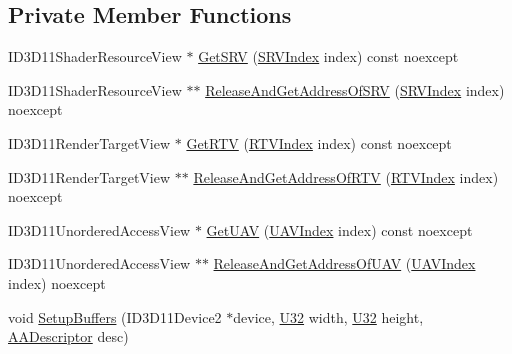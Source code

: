\subsection*{Private Member Functions}
\begin{DoxyCompactItemize}
\item 
I\+D3\+D11\+Shader\+Resource\+View $\ast$ \hyperlink{classmage_1_1_rendering_output_manager_adbccd7240023dd803ce7764e6d4e3298}{Get\+S\+RV} (\hyperlink{classmage_1_1_rendering_output_manager_a25aa12ba77bb160c5641cf54f7a68a29}{S\+R\+V\+Index} index) const noexcept
\item 
I\+D3\+D11\+Shader\+Resource\+View $\ast$$\ast$ \hyperlink{classmage_1_1_rendering_output_manager_ab6b8045718c2dbfc8b64c23d220a2288}{Release\+And\+Get\+Address\+Of\+S\+RV} (\hyperlink{classmage_1_1_rendering_output_manager_a25aa12ba77bb160c5641cf54f7a68a29}{S\+R\+V\+Index} index) noexcept
\item 
I\+D3\+D11\+Render\+Target\+View $\ast$ \hyperlink{classmage_1_1_rendering_output_manager_a367665fe249f8dd373ae48f4f6c731bd}{Get\+R\+TV} (\hyperlink{classmage_1_1_rendering_output_manager_aebe136819797593f0fcf53b753e9c3ce}{R\+T\+V\+Index} index) const noexcept
\item 
I\+D3\+D11\+Render\+Target\+View $\ast$$\ast$ \hyperlink{classmage_1_1_rendering_output_manager_a1b8102ba96cdab743499da051ca4fa3f}{Release\+And\+Get\+Address\+Of\+R\+TV} (\hyperlink{classmage_1_1_rendering_output_manager_aebe136819797593f0fcf53b753e9c3ce}{R\+T\+V\+Index} index) noexcept
\item 
I\+D3\+D11\+Unordered\+Access\+View $\ast$ \hyperlink{classmage_1_1_rendering_output_manager_a69f782de38807401a5ee6ab4d47a928c}{Get\+U\+AV} (\hyperlink{classmage_1_1_rendering_output_manager_a34cdd58dd0dda9d78878d79aa3393b89}{U\+A\+V\+Index} index) const noexcept
\item 
I\+D3\+D11\+Unordered\+Access\+View $\ast$$\ast$ \hyperlink{classmage_1_1_rendering_output_manager_acd5d6a8feb5a7d9aa41667be0cef617b}{Release\+And\+Get\+Address\+Of\+U\+AV} (\hyperlink{classmage_1_1_rendering_output_manager_a34cdd58dd0dda9d78878d79aa3393b89}{U\+A\+V\+Index} index) noexcept
\item 
void \hyperlink{classmage_1_1_rendering_output_manager_a380fd0b2507a438c3750b7654f6ebc14}{Setup\+Buffers} (I\+D3\+D11\+Device2 $\ast$device, \hyperlink{namespacemage_a41c104c036fba3756a74e19f793eeaa1}{U32} width, \hyperlink{namespacemage_a41c104c036fba3756a74e19f793eeaa1}{U32} height, \hyperlink{namespacemage_a86cd40b8f2f42ca4d616cc6ec665a7f2}{A\+A\+Descriptor} desc)
$$
\end{DoxyCompactItemize}
